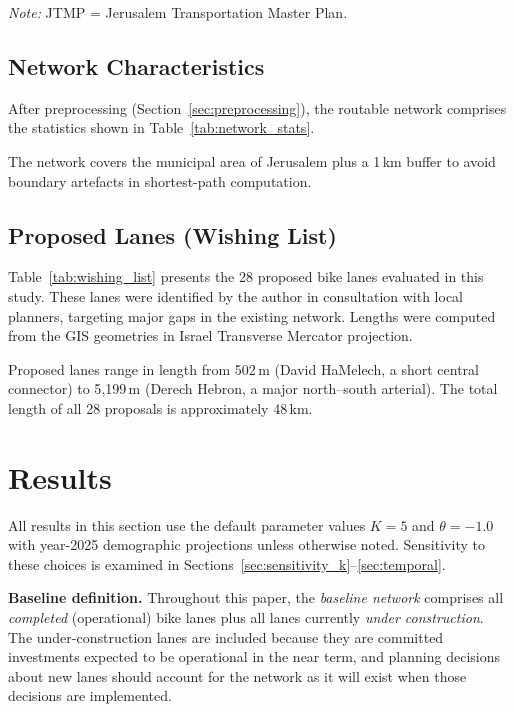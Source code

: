 \documentclass[12pt,a4paper]{article}
\begin{document}


\noindent \textit{Note:} JTMP = Jerusalem Transportation Master Plan.

\subsection{Network Characteristics}

After preprocessing (Section~\ref{sec:preprocessing}), the routable network comprises the statistics shown in Table~\ref{tab:network_stats}.



The network covers the municipal area of Jerusalem plus a 1\,km buffer to avoid boundary artefacts in shortest-path computation.

\subsection{Proposed Lanes (Wishing List)}

Table~\ref{tab:wishing_list} presents the 28 proposed bike lanes evaluated in this study. These lanes were identified by the author in consultation with local planners, targeting major gaps in the existing network. Lengths were computed from the GIS geometries in Israel Transverse Mercator projection.



Proposed lanes range in length from 502\,m (David HaMelech, a short central connector) to 5{,}199\,m (Derech Hebron, a major north--south arterial). The total length of all 28 proposals is approximately 48\,km.

\section{Results}
\label{sec:results}

All results in this section use the default parameter values $K = 5$ and $\theta = -1.0$ with year-2025 demographic projections unless otherwise noted. Sensitivity to these choices is examined in Sections~\ref{sec:sensitivity_k}--\ref{sec:temporal}.

\textbf{Baseline definition.} Throughout this paper, the \emph{baseline network} comprises all \emph{completed} (operational) bike lanes plus all lanes currently \emph{under construction}. The under-construction lanes are included because they are committed investments expected to be operational in the near term, and planning decisions about new lanes should account for the network as it will exist when those decisions are implemented.
\end{document}

